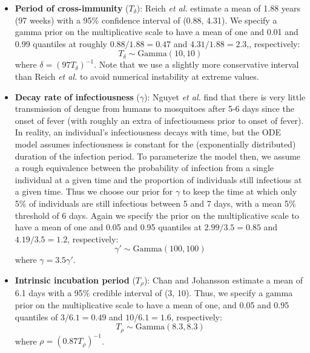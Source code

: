 \documentclass[10pt,letterpaper]{article}
\begin{document}
\begin{itemize}
\item \textbf{Period of cross-immunity} ($T_{\delta}$): Reich \emph{et al.} \cite{Reich2013} estimate a mean of 1.88 years (97 weeks) with a 95\% confidence interval of (0.88, 4.31).
We specify a gamma prior on the multiplicative scale to have a mean of one and 0.01 and 0.99 quantiles at roughly $0.88/1.88 = 0.47$ and $4.31/1.88 = 2.3$,, respectively:
\begin{equation}
T_{\delta} \sim \text{Gamma}(10, 10)
\end{equation}
where $\delta = (97 T_\delta)^{-1}$.
Note that we use a slightly more conservative interval than Reich \emph{et al.} to avoid numerical instability at extreme values.
\\
\item \textbf{Decay rate of infectiousness} ($\gamma$): Nguyet \emph{et al.} \cite{Nguyet2013} find that there is very little transmission of dengue from humans to mosquitoes after 5-6 days since the onset of fever (with roughly an extra of infectiousness prior to onset of fever).
In reality, an individual's infectiousness decays with time, but the ODE model assumes infectiousness is constant for the (exponentially distributed) duration of the infection period.    
To parameterize the model then, we assume a rough equivalence between the probability of infection from a single individual at a given time and the proportion of individuals still infectious at a given time.
Thus we choose our prior for $\gamma$ to keep the time at which only 5\% of individuals are still infectious between 5 and 7 days, with a mean 5\% threshold of 6 days.
Again we specify the prior on the multiplicative scale to have a mean of one and 0.05 and 0.95 quantiles at $2.99/3.5 = 0.85$ and $4.19 / 3.5 = 1.2$, respectively:
\begin{equation}
\gamma' \sim \text{Gamma}(100, 100)
\end{equation}
where $\gamma = 3.5\gamma'$.
\\
\item \textbf{Intrinsic incubation period} ($T_{\rho}$): Chan and Johansson \cite{Chan2012} estimate a mean of 6.1 days with a 95\% credible interval of (3, 10).
Thus, we specify a gamma prior on the multiplicative scale to have a mean of one, and 0.05 and 0.95 quantiles of $3 / 6.1 = 0.49$ and $10 / 6.1 = 1.6$, respectively:
\begin{equation}
T_{\rho} \sim \text{Gamma}(8.3, 8.3)
\end{equation}
where $\rho = (0.87 T_{\rho})^{-1}$.

\end{itemize}
\end{document}
